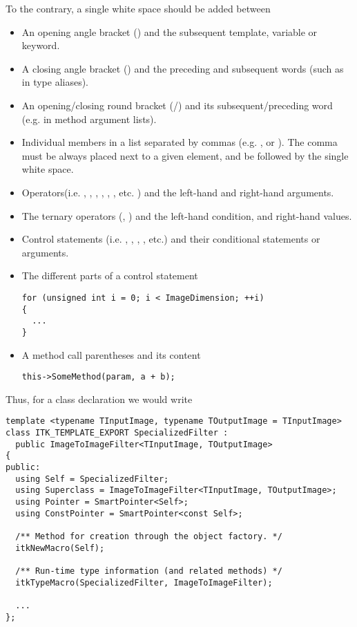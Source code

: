 To the contrary, a single white space should be added between
\begin{itemize}
\item An opening angle bracket (\code{<}) and the subsequent template,
variable or keyword.
\item A closing angle bracket (\code{>}) and the preceding and subsequent
words (such as in type aliases).
\item An opening/closing round bracket (\code{(}/\code{)}) and its
subsequent/preceding word (e.g. in method argument lists).
\item Individual members in a list separated by commas (e.g.
, or ). The comma must be
always placed next to a given element, and be followed by the single white space.
\item Operators(i.e. \code{+}, \code{-}, \code{=}, \code{==}, \code{+=},
\code{<<}, etc. ) and the left-hand and right-hand arguments.
\item The ternary operators (, \code{:}) and the left-hand condition,
and right-hand values.
\item Control statements (i.e. , , ,
, etc.) and their conditional statements or arguments.
\item The different parts of a  control statement

\small
\begin{verbatim}
for (unsigned int i = 0; i < ImageDimension; ++i)
{
  ...
}
\end{verbatim}
\normalsize

\item A method call parentheses and its content

\small
\begin{verbatim}
this->SomeMethod(param, a + b);
\end{verbatim}
\normalsize

\end{itemize}

Thus, for a class declaration we would write

\small
\begin{verbatim}
template <typename TInputImage, typename TOutputImage = TInputImage>
class ITK_TEMPLATE_EXPORT SpecializedFilter :
  public ImageToImageFilter<TInputImage, TOutputImage>
{
public:
  using Self = SpecializedFilter;
  using Superclass = ImageToImageFilter<TInputImage, TOutputImage>;
  using Pointer = SmartPointer<Self>;
  using ConstPointer = SmartPointer<const Self>;

  /** Method for creation through the object factory. */
  itkNewMacro(Self);

  /** Run-time type information (and related methods) */
  itkTypeMacro(SpecializedFilter, ImageToImageFilter);

  ...
};
\end{verbatim}
\normalsize

